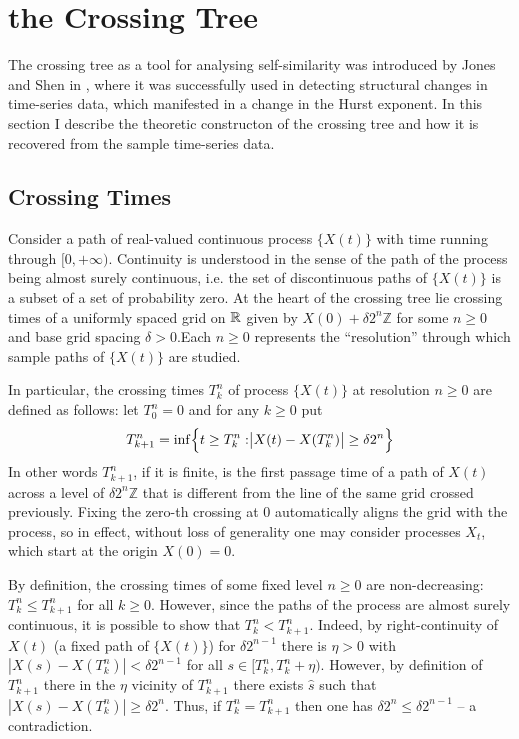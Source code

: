 \chapter{the Crossing Tree} %
\label{cha:the_crossing_tree}

The crossing tree as a tool for analysing self-similarity was introduced by Jones
and Shen in \cite{jones2004}, where it was successfully used in detecting structural
changes in time-series data, which manifested in a change in the Hurst exponent.
In this section I describe the theoretic constructon of the crossing tree and how
it is recovered from the sample time-series data.

\section{Crossing Times} %
\label{sec:crossing_times}

Consider a path of real-valued continuous process $\{X(t)\}$ with time running through
$[0,+\infty)$. Continuity is understood in the sense of the path of the process
being almost surely continuous, i.e. the set of discontinuous paths of $\{X(t)\}$
is a subset of a set of probability zero. At the heart of the crossing tree lie
crossing times of a uniformly spaced grid on $\mathbb{R}$ given by $X(0) + \delta 2^n \mathbb{Z}$
for some $n\geq 0$ and base grid spacing $\delta > 0$.\footnotemark Each $n\geq 0$
represents the ``resolution'' through which sample paths of $\{X(t)\}$ are studied.

In particular, the crossing times $T_k^n$ of process $\{X(t)\}$ at resolution $n\geq 0$
are defined as follows: let $T_0^n = 0$ and for any $k\geq 0$ put
\[
T_{k+1}^n
= \inf \Bigl\{ t \geq T^n_k : \bigr | X(t) - X(T^n_k) \bigr | \geq \delta 2^n \Bigr\}
\]
In other words $T_{k+1}^n$, if it is finite, is the first passage time of a path of
$X(t)$ across a level of $\delta 2^n \mathbb{Z}$ that is different from the line of
the same grid crossed previously. Fixing the zero-th crossing at $0$ automatically
aligns the grid with the process, so in effect, without loss of generality one may
consider processes $X_t$, which start at the origin $X(0)=0$.

By definition, the crossing times of some fixed level $n\geq 0$ are non-decreasing:
$T_k^n \leq T_{k+1}^n$ for all $k\geq 0$. However, since the paths of the process are
almost surely continuous, it is possible to show that $T_k^n < T_{k+1}^n$. Indeed,
by right-continuity of $X(t)$ (a fixed path of $\{X(t)\}$) for $\delta 2^{n-1}$
there is $\eta>0$ with $|X(s)-X(T_k^n)| < \delta 2^{n-1}$ for all $s\in [T_k^n, T_k^n + \eta)$.
However, by definition of $T_{k+1}^n$ there in the $\eta$ vicinity of $T_{k+1}^n$
there exists $\hat{s}$ such that $|X(\hat{s})-X(T_k^n)|\geq \delta 2^n$. Thus, if
$T_k^n = T_{k+1}^n$ then one has $\delta 2^n \leq \delta 2^{n-1}$ -- a contradiction.

